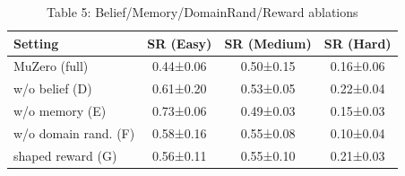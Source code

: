 \begin{table}[htbp]
\centering
\caption{Table 5: Belief/Memory/DomainRand/Reward ablations}
\begin{tabular}{lccc}
\toprule
Setting & SR (Easy) & SR (Medium) & SR (Hard) \\
\midrule
MuZero (full) & 0.44±0.06 & 0.50±0.15 & 0.16±0.06 \\
w/o belief (D) & 0.61±0.20 & 0.53±0.05 & 0.22±0.04 \\
w/o memory (E) & 0.73±0.06 & 0.49±0.03 & 0.15±0.03 \\
w/o domain rand. (F) & 0.58±0.16 & 0.55±0.08 & 0.10±0.04 \\
shaped reward (G) & 0.56±0.11 & 0.55±0.10 & 0.21±0.03 \\
\bottomrule
\end{tabular}
\end{table}
